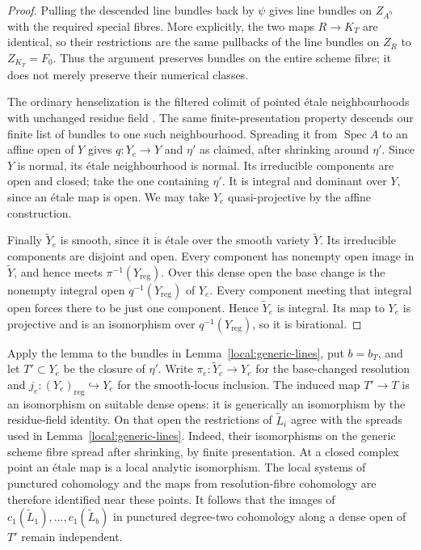 \begin{proof}
Pulling the descended line bundles back by $\psi$ gives line bundles
on $Z_{A^h}$ with the required special fibres.  More explicitly, the
two maps $R\to K_T$ are identical, so their restrictions are the
same pullbacks of the line bundles on $Z_R$ to $Z_{K_T}=F_0$.
Thus the argument preserves bundles on the entire scheme fibre;
it does not merely preserve their numerical classes.

The ordinary henselization is the filtered colimit of pointed
\'etale neighbourhoods with unchanged residue
field \cite[Tags~0A02 and~0A03]{Stacks}.  The same
finite-presentation property descends our finite list of bundles to
one such neighbourhood.  Spreading it from $\operatorname{Spec}A$
to an affine open of $Y$ gives $q:Y_e\to Y$ and $\eta'$ as claimed,
after shrinking around $\eta'$.  Since $Y$ is normal, its
\'etale neighbourhood is normal.  Its irreducible
components are open and closed; take the one containing $\eta'$.
It is integral and dominant over $Y$, since an
\'etale map is open.  We may take $Y_e$
quasi-projective by the affine construction.

Finally $\widetilde Y_e$ is smooth, since it is
\'etale over the smooth variety $\widetilde Y$.
Its irreducible components are disjoint and open.  Every component
has nonempty open image in $\widetilde Y$, and hence meets
$\pi^{-1}(Y_{\mathrm{reg}})$.  Over this dense open the base change
is the nonempty integral open $q^{-1}(Y_{\mathrm{reg}})$ of $Y_e$.
Every component meeting that integral open forces there to be just
one component.  Hence $\widetilde Y_e$ is integral.  Its map to
$Y_e$ is projective and is an isomorphism over
$q^{-1}(Y_{\mathrm{reg}})$, so it is birational.
\end{proof}

Apply the lemma to the bundles in Lemma~\ref{local:generic-lines},
put $b=b_T$, and let $T'\subset Y_e$ be the closure of $\eta'$.
Write $\pi_e:\widetilde Y_e\to Y_e$ for the base-changed resolution and
$j_e:(Y_e)_{\mathrm{reg}}\hookrightarrow Y_e$ for the smooth-locus inclusion.
The induced map
$T'\to T$ is an isomorphism on suitable dense opens: it is
generically an isomorphism by the residue-field identity.  On that
open the restrictions of $\widetilde L_i$ agree with the spreads used
in Lemma~\ref{local:generic-lines}.  Indeed, their isomorphisms on the
generic scheme fibre spread after shrinking, by finite presentation.
At a closed complex point an \'etale map is a
local analytic isomorphism.  The local systems of punctured
cohomology and the maps from resolution-fibre cohomology are
therefore identified near these points.  It follows that the images
of $c_1(\widetilde L_1),\ldots,c_1(\widetilde L_b)$ in punctured
degree-two cohomology along a dense open of $T'$ remain independent.


